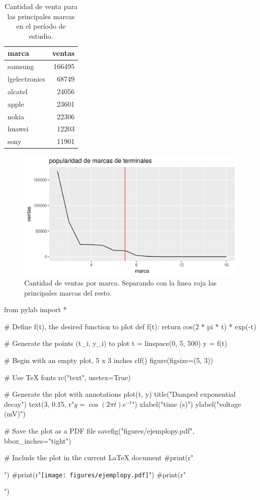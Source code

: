 \begin{table}[ht]
\centering
\begin{tabular}{lr}
  \hline
marca & ventas \\ 
  \hline
samsung & 166495 \\ 
  lgelectronics & 68749 \\ 
  alcatel & 24056 \\ 
  apple & 23601 \\ 
  nokia & 22306 \\ 
  huawei & 12203 \\ 
  sony & 11901 \\ 
   \hline
\end{tabular}
\caption{Cantidad de venta para las principales marcas en el período de estudio.} 
\label{tab:marcas_top}
\end{table}


\begin{figure}[bhtp]
\begin{center}
\includegraphics[scale=0.6]{figures/ejemplo.png}
\caption{Cantidad de ventas por marca. Separando con la linea roja las principales marcas del resto.}
\label{fig:marcas}
\end{center}
\end{figure}



\begin{pycode}
from pylab import *

# Define f(t), the desired function to plot
def f(t):
    return cos(2 * pi * t) * exp(-t)

# Generate the points (t_i, y_i) to plot
t = linspace(0, 5, 500)
y = f(t)

# Begin with an empty plot, 5 x 3 inches
clf()
figure(figsize=(5, 3))

# Use TeX fonts
rc("text", usetex=True)

# Generate the plot with annotations
plot(t, y)
title("Damped exponential decay")
text(3, 0.15, r"$y = \cos(2 \pi t) e^{-t}$")
xlabel("time (s)")
ylabel("voltage (mV)")

# Save the plot as a PDF file
savefig("figures/ejemplopy.pdf", bbox_inches="tight")

# Include the plot in the current LaTeX document
#print(r"\begin{center}")
#print(r"\texttt{[image: figures/ejemplopy.pdf]}")
#print(r"\end{center}")
\end{pycode}

